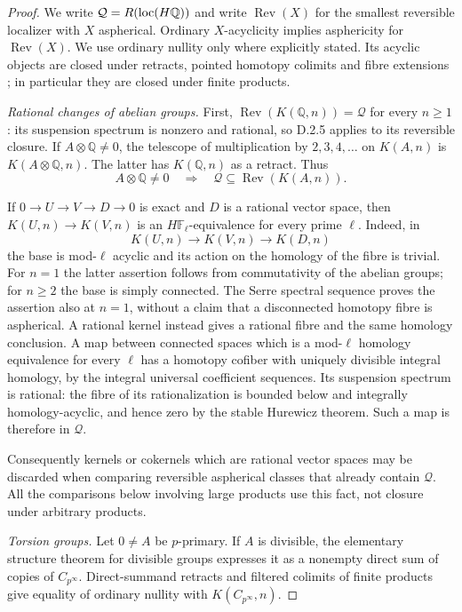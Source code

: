 \begin{proof}
We write $\mathcal Q=R(\operatorname{loc}(H\mathbb Q))$ and write
$\operatorname{Rev}(X)$ for the smallest reversible localizer with
$X$ aspherical.  Ordinary $X$-acyclicity implies asphericity for
$\operatorname{Rev}(X)$.  We use ordinary nullity only where explicitly
stated.  Its acyclic objects are closed under retracts, pointed
homotopy colimits and fibre extensions
\citep[beginning of Section~5]{EH5Bousfield1997}; in particular they
are closed under finite products.

\medskip\noindent
\emph{Rational changes of abelian groups.}
First, $\operatorname{Rev}(K(\mathbb Q,n))=\mathcal Q$ for every
$n\geq1$: its suspension spectrum is nonzero and rational, so D.2.5
applies to its reversible closure.  If $A\otimes\mathbb Q\ne0$,
the telescope of multiplication by $2,3,4,\ldots$ on $K(A,n)$ is
$K(A\otimes\mathbb Q,n)$.  The latter has $K(\mathbb Q,n)$ as a
retract.  Thus
\[
 A\otimes\mathbb Q\ne0\quad\Longrightarrow\quad
                \mathcal Q\subseteq\operatorname{Rev}(K(A,n)).
 \tag{D.3.7d}
\]

If $0\to U\to V\to D\to0$ is exact and $D$ is a rational vector
space, then $K(U,n)\to K(V,n)$ is an $H\mathbb F_\ell$-equivalence
for every prime $\ell$.  Indeed, in
\[
 K(U,n)\longrightarrow K(V,n)\longrightarrow K(D,n)
\]
the base is mod-$\ell$ acyclic and its action on the homology of the
fibre is trivial.  For $n=1$ the latter assertion follows from
commutativity of the abelian groups; for $n\geq2$ the base is simply
connected.  The Serre spectral sequence proves the assertion also at
$n=1$, without a claim that a disconnected homotopy fibre is
aspherical.  A rational kernel instead gives a rational fibre and the
same homology conclusion.  A map between connected spaces which is a
mod-$\ell$ homology equivalence for every $\ell$ has a homotopy
cofiber with uniquely divisible integral homology, by the integral
universal coefficient sequences.  Its suspension spectrum is
rational: the fibre of its rationalization is bounded below and
integrally homology-acyclic, and hence zero by the stable Hurewicz
theorem.  Such a map is therefore in $\mathcal Q$.

Consequently kernels or cokernels which are rational vector spaces
may be discarded when comparing reversible aspherical classes that
already contain $\mathcal Q$.  All the comparisons below involving
large products use this fact, not closure under arbitrary products.

\medskip\noindent
\emph{Torsion groups.}
Let $0\ne A$ be $p$-primary.  If $A$ is divisible, the elementary
structure theorem for divisible groups expresses it as a nonempty
direct sum of copies of $C_{p^\infty}$.  Direct-summand retracts and
filtered colimits of finite products give equality of ordinary
nullity with $K(C_{p^\infty},n)$.


\end{proof}
